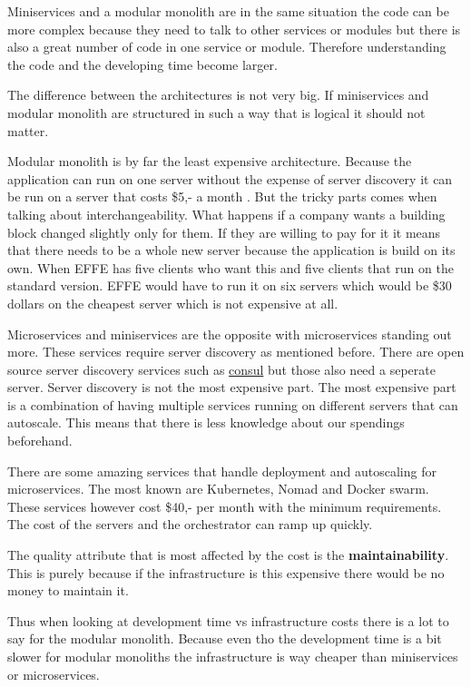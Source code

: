 Miniservices and a modular monolith are in the same situation the code can be more complex because they need to talk to other services or modules but there is also a great number of code in one service or module. Therefore understanding the code and the developing time become larger.

The difference between the architectures is not very big. If miniservices and modular monolith are structured in such a way that is logical it should not matter.

Modular monolith is by far the least expensive architecture. Because the application can run on one server without the expense of server discovery it can be run on a server that costs \$5,- a month \cite{digitalOcean}. But the tricky parts comes when talking about interchangeability. What happens if a company wants a building block changed slightly only for them. If they are willing to pay for it it means that there needs to be a whole new server because the application is build on its own. When EFFE has five clients who want this and five clients that run on the standard version. EFFE would have to run it on six servers which would be \$30 dollars on the cheapest server which is not expensive at all.

Microservices and miniservices are the opposite with microservices standing out more. These services require server discovery as mentioned before. There are open source server discovery services such as \href{https://www.consul.io/}{consul} but those also need a seperate server. Server discovery is not the most expensive part. The most expensive part is a combination of having multiple services running on different servers that can autoscale. This means that there is less knowledge about our spendings beforehand.

There are some amazing services that handle deployment and autoscaling for microservices. The most known are Kubernetes, Nomad and Docker swarm. These services however cost \$40,- per month with the minimum requirements. The cost of the servers and the orchestrator can ramp up quickly.

The quality attribute that is most affected by the cost is the \textbf{maintainability}. This is purely because if the infrastructure is this expensive there would be no money to maintain it.

Thus when looking at development time vs infrastructure costs there is a lot to say for the modular monolith. Because even tho the development time is a bit slower for modular monoliths the infrastructure is way cheaper than miniservices or microservices.

